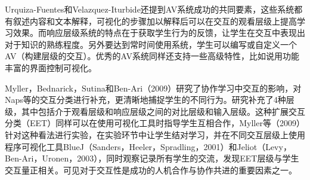 \begin{sectext}
Urquiza-Fuentes和Velazquez-Iturbide还提到AV系统成功的共同要素，这些系统都有叙述内容和文本解释，可视化的步骤加以解释后可以在交互的观看层级上提高学习效果。而响应层级系统的特点在于获取学生行为的反馈，让学生在交互中表现出对于知识的熟练程度。另外要达到常时间使用系统，学生可以编写或自定义一个AV（构建层级的交互）。优秀的AV系统同样还支持一些高级特性，比如说用功能丰富的界面控制可视化。

Myller，Bednarick，Sutina和Ben-Ari（2009）研究了协作学习中交互的影响，对Naps等的交互分类进行补充，更清晰地捕捉学生的不同行为。研究补充了4种层级，其中包括介于观看层级和响应层级之间的对比层级和输入层级。这种扩展交互分类（EET）同样可以在使用可视化工具时指导学生互相合作，Myller等（2009）针对这种看法进行实验，在实验环节中让学生结对学习，并在不同交互层级上使用程序可视化工具BlueJ（Sanders，Heeler，Spradling，2001）和Jeliot（Levy，Ben-Ari，Uronen，2003），同时观察记录所有学生的交流，发现EET层级与学生交互量正相关。可见对于交互性是成功的人机合作与协作共进的重要因素之一。
\end{sectext}
